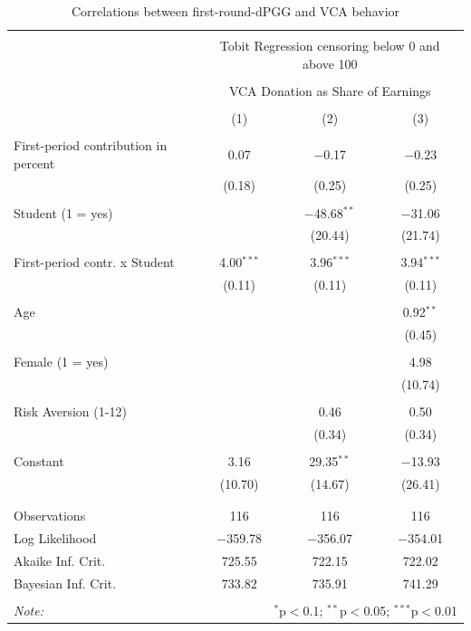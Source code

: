 \documentclass[
  authoryear,
  review,
  3p,
  onecolumn]{elsarticle}
\begin{document}
\hypertarget{tbl-tobit-generalizability}{}
\begin{table}[!htbp] \centering 
  \caption{\label{tbl-tobit-generalizability}Correlations between first-round-dPGG and VCA behavior } 
  \label{} 
\begin{tabular}{@{\extracolsep{5pt}}lccc} 
\\[-1.8ex]\hline 
\hline \\[-1.8ex] 
 & \multicolumn{3}{c}{Tobit Regression censoring below 0 and above 100} \\ 
\cline{2-4} 
\\[-1.8ex] & \multicolumn{3}{c}{VCA Donation as Share of Earnings} \\ 
\\[-1.8ex] & (1) & (2) & (3)\\ 
\hline \\[-1.8ex] 
 First-period contribution in percent & 0.07 & $-$0.17 & $-$0.23 \\ 
  & (0.18) & (0.25) & (0.25) \\ 
  & & & \\ 
 Student (1 = yes) &  & $-$48.68$^{**}$ & $-$31.06 \\ 
  &  & (20.44) & (21.74) \\ 
  & & & \\ 
 First-period contr. x Student & 4.00$^{***}$ & 3.96$^{***}$ & 3.94$^{***}$ \\ 
  & (0.11) & (0.11) & (0.11) \\ 
  & & & \\ 
 Age &  &  & 0.92$^{**}$ \\ 
  &  &  & (0.45) \\ 
  & & & \\ 
 Female (1 = yes) &  &  & 4.98 \\ 
  &  &  & (10.74) \\ 
  & & & \\ 
 Risk Aversion (1-12) &  & 0.46 & 0.50 \\ 
  &  & (0.34) & (0.34) \\ 
  & & & \\ 
 Constant & 3.16 & 29.35$^{**}$ & $-$13.93 \\ 
  & (10.70) & (14.67) & (26.41) \\ 
  & & & \\ 
\hline \\[-1.8ex] 
Observations & 116 & 116 & 116 \\ 
Log Likelihood & $-$359.78 & $-$356.07 & $-$354.01 \\ 
Akaike Inf. Crit. & 725.55 & 722.15 & 722.02 \\ 
Bayesian Inf. Crit. & 733.82 & 735.91 & 741.29 \\ 
\hline 
\hline \\[-1.8ex] 
\textit{Note:}  & \multicolumn{3}{r}{$^{*}$p$<$0.1; $^{**}$p$<$0.05; $^{***}$p$<$0.01} \\ 
\end{tabular} 
\end{table}
\end{document}

